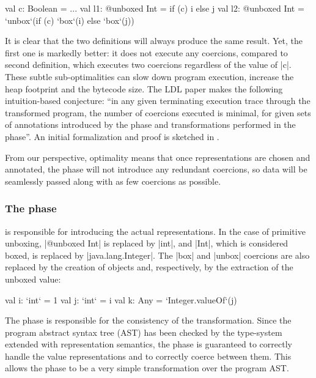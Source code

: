 \begin{lstlisting-nobreak}
val c: Boolean = ...
val l1: @unboxed Int = if (c) i else j
val l2: @unboxed Int = `unbox`(if (c) `box`(i) else `box`(j))
\end{lstlisting-nobreak}

It is clear that the two definitions will always produce the same
result. Yet, the first one is markedly better: it does not execute
any coercions, compared to second definition, which executes two
coercions regardless of the value of |c|. These subtle
sub-optimalities can slow down program execution, increase the heap
footprint and the bytecode size. 
The LDL paper \cite{ldl} makes the following
intuition-based conjecture: ``in any given terminating
execution trace through the transformed program, the number of
coercions executed is minimal,
for given sets of annotations introduced by
the \inject{} phase and transformations performed in the \commit{}
phase''. An initial formalization and proof is sketched in \cite{ldl-form}.

From our perspective, optimality means that once representations are chosen and annotated,
the \coerce{} phase will not introduce any redundant coercions, so data will be seamlessly passed along with as few coercions as possible.

\vspace{-0.3em}
\subsubsection{The \commit{} phase} is responsible for introducing the actual
representations. In the case of primitive unboxing, |@unboxed Int| is
replaced by |int|, and |Int|, which is considered boxed, is replaced
by |java.lang.Integer|. The |box| and |unbox| coercions are also
replaced by the creation of objects and, respectively, by the
extraction of the unboxed value:

\vspace{-0.4em}
\begin{lstlisting-nobreak}
val i: `int` = 1
val j: `int` = i
val k: Any = `Integer.valueOf`(j)
\end{lstlisting-nobreak}

The \commit{} phase is responsible for the consistency of the transformation. Since the program abstract syntax tree (AST) has been checked by the type-system extended with representation semantics, the \commit{} phase is guaranteed to correctly handle the value representations and to correctly coerce between them. This allows the \commit{} phase to be a very simple transformation over the program AST.

